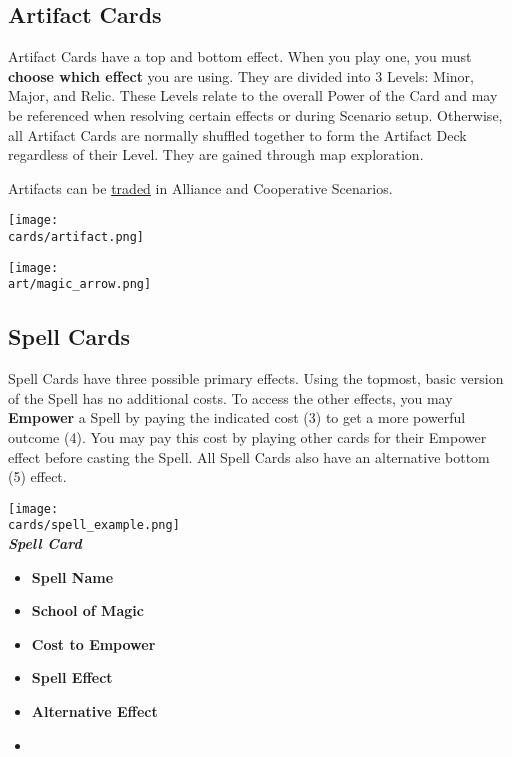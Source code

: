 \begin{multicols*}{2}
\vspace*{\fill}

\columnbreak

\subsection*{Artifact Cards}

Artifact Cards have a top and bottom effect. When you play one, you must \textbf{choose which effect} you are using.
They are divided into 3 Levels: Minor, Major, and Relic.
These Levels relate to the overall Power of the Card and may be referenced when resolving certain effects or during Scenario setup.
Otherwise, all Artifact Cards are normally shuffled together to form the Artifact Deck regardless of their Level.
They are gained through map exploration.\par
Artifacts can be \hyperlink{Trading}{traded} in Alliance and Cooperative Scenarios.\par
\texttt{[image: \\cards/artifact.png]}

\vspace*{\fill}
\texttt{[image: \\art/magic\_arrow.png]}

\filbreak

\subsection*{\hypertarget{spells}{Spell Cards}}

Spell Cards have three possible primary effects.
Using the topmost, basic version of the Spell has no additional costs.
To access the other effects, you may \textbf{Empower} a Spell by paying the indicated cost (3) to get a more powerful outcome (4).
You may pay this cost by playing other cards for their Empower  effect before casting the Spell.
All Spell Cards also have an alternative bottom (5)  effect.\par


\begin{center}
  \texttt{[image: \\cards/spell\_example.png]}\\
  \medskip
  \footnotesize{\textbf{\textit{\textcolor{darkcandyapplered}{Spell Card}}}}
  \scriptsize
  \begin{multicols}{2}
    \begin{itemize}[itemsep=5pt]
      \item[\textbf{1.}] \textbf{Spell Name}
      \item[\textbf{2.}] \textbf{School of Magic}
      \item[\textbf{3.}] \textbf{Cost to Empower}
      \item[\textbf{4.}] \textbf{Spell Effect}
      \item[\textbf{5.}] \textbf{Alternative Effect}
      \item[]
    \end{itemize}
  \end{multicols}
\end{center}


\end{multicols*}
